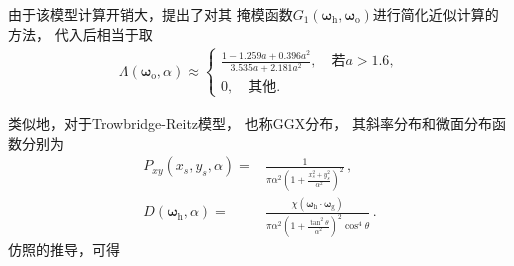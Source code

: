 由于该模型计算开销大，\citet{10.5555/2383847.2383874}提出了对其
掩模函数$G_1({\bm\omega}_{\mathrm{h}},{\bm\omega}_{\mathrm{o}})$进行简化近似计算的方法，
代入后相当于取
\begin{align}\label{eq:08-ex01-approximation-Beckmann}
    \Lambda({\bm\omega}_{\mathrm{o}},\alpha)\approx\left\{\begin{array}{l}
        \displaystyle\frac{1-1.259a+0.396a^2}{3.535a+2.181a^2},\quad\text{若}a>1.6, \\
        0,\quad\text{其他}.
    \end{array}\right.
\end{align}

类似地，对于Trowbridge-Reitz模型\citep{Trowbridge:75}，
也称GGX分布\citep{10.5555/2383847.2383874}，
其斜率分布和微面分布函数分别为
\begin{align}
    P_{xy}(x_s,y_s,\alpha)=&\frac{1}{\displaystyle\pi\alpha^2\left(1+\frac{x_s^2+y_s^2}{\alpha^2}\right)^2}\, ,\\
    D({\bm\omega}_{\mathrm{h}},\alpha)=&\frac{\chi({\bm\omega}_{\mathrm{h}}\cdot{\bm\omega}_{\mathrm{g}})}
    {\displaystyle\pi\alpha^2\left(1+\frac{\tan^2\theta}{\alpha^2}\right)^2\cos^4\theta}\, .
\end{align}
仿照的推导，可得
